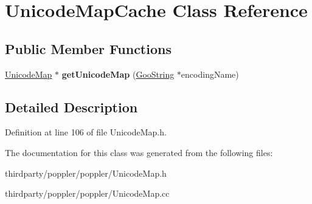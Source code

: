 \hypertarget{class_unicode_map_cache}{}\section{Unicode\+Map\+Cache Class Reference}
\label{class_unicode_map_cache}
\subsection*{Public Member Functions}
\begin{DoxyCompactItemize}
\item 
\mbox{\label{class_unicode_map_cache_ad6b93f8610e095ebc31207f7d2b02380}} 
\hyperlink{class_unicode_map}{Unicode\+Map} $\ast$ {\bfseries get\+Unicode\+Map} (\hyperlink{class_goo_string}{Goo\+String} $\ast$encoding\+Name)
\end{DoxyCompactItemize}


\subsection{Detailed Description}


Definition at line 106 of file Unicode\+Map.\+h.



The documentation for this class was generated from the following files\+:\begin{DoxyCompactItemize}
\item 
thirdparty/poppler/poppler/Unicode\+Map.\+h\item 
thirdparty/poppler/poppler/Unicode\+Map.\+cc\end{DoxyCompactItemize}

